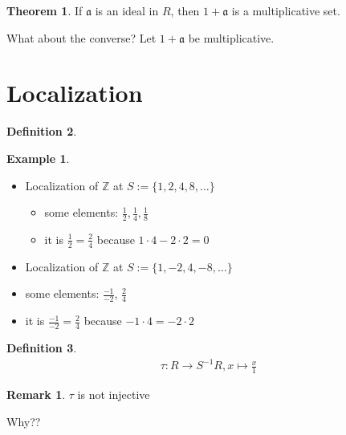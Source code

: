 \documentclass[a4paper]{book}
\theoremstyle{definition}
\newtheorem{definition}{Definition}[]
\newtheorem{example}{Example}[definition]
\newtheorem{theorem}[definition]{Theorem}
\newtheorem*{remark}{Remark}
\begin{document}
\begin{thmbox}
    \begin{theorem}
        If \(\mathfrak{a}\) is an ideal in \(R\), then \(1 + \mathfrak{a}\) is a multiplicative set.
    \end{theorem}
\end{thmbox}

What about the converse? Let \(1 + \mathfrak{a}\) be multiplicative. 

\newpage
\section{Localization}
\begin{defbox}
    \begin{definition}
        
    \end{definition}
\end{defbox}

\begin{example}
    \begin{itemize}
        \item Localization of \(\mathbb{Z}\) at \(S:= \{1, 2, 4, 8, \ldots\}\)
        \begin{itemize}
            \item some elements: \(\frac{1}{2}, \frac{1}{4}, \frac{1}{8}\)
            \item it is \(\frac{1}{2} = \frac{2}{4}\) because \(1 \cdot 4 - 2 \cdot 2 = 0\)
        \end{itemize}
        \item Localization of \(\mathbb{Z}\) at \(S:= \{1, -2, 4, -8, \ldots\}\)
        \item some elements: \(\frac{-1}{-2}\), \(\frac{2}{4}\)
        \item it is \(\frac{-1}{-2} = \frac{2}{4}\) because \(-1 \cdot 4 = -2 \cdot 2\)
    \end{itemize}
\end{example}

\begin{defbox}
    \begin{definition}
        \begin{align*}
            \tau: R \longrightarrow S^{-1}R, x \mapsto \frac{x}{1}
        \end{align*}
    \end{definition}
\end{defbox}

\begin{rembox}
    \begin{remark}
        \(\tau\) is not injective
    \end{remark}
\end{rembox}
Why??
\end{document}
